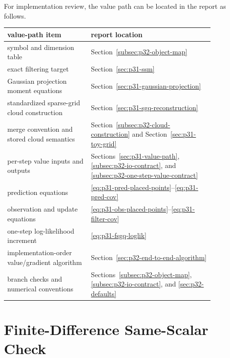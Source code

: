 \documentclass[11pt]{article}
\numberwithin{equation}{section}
\begin{document}
For implementation review, the value path can be located in the report as
follows.
\begin{center}
\small
\begin{tabular}{p{0.34\linewidth}p{0.50\linewidth}}
\toprule
value-path item & report location \\
\midrule
symbol and dimension table & Section~\ref{subsec:p32-object-map} \\
exact filtering target & Section~\ref{sec:p31-ssm} \\
Gaussian projection moment equations & Section~\ref{sec:p31-gaussian-projection} \\
standardized sparse-grid cloud construction & Section~\ref{sec:p31-sgq-reconstruction} \\
merge convention and stored cloud semantics & Section~\ref{subsec:p32-cloud-construction} and Section~\ref{sec:p31-toy-grid} \\
per-step value inputs and outputs & Sections~\ref{sec:p31-value-path}, \ref{subsec:p32-io-contract}, and \ref{subsec:p32-one-step-value-contract} \\
prediction equations & \eqref{eq:p31-pred-placed-points}--\eqref{eq:p31-pred-cov} \\
observation and update equations & \eqref{eq:p31-obs-placed-points}--\eqref{eq:p31-filter-cov} \\
one-step log-likelihood increment & \eqref{eq:p31-fsgq-loglik} \\
implementation-order value/gradient algorithm & Section~\ref{sec:p32-end-to-end-algorithm} \\
branch checks and numerical conventions & Sections~\ref{subsec:p32-object-map}, \ref{subsec:p32-io-contract}, and \ref{sec:p32-defaults} \\
\bottomrule
\end{tabular}
\end{center}

\section{Finite-Difference Same-Scalar Check}
\label{sec:p31-fd}
\end{document}
